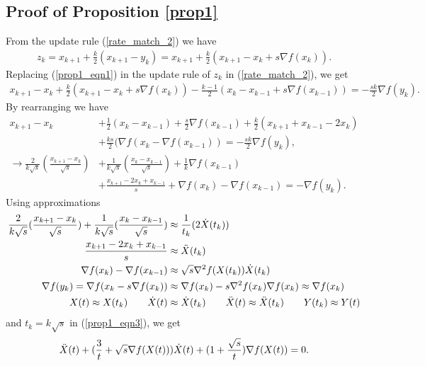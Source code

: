 \documentclass{article}
\theoremstyle{plain}
\theoremstyle{definition}
\theoremstyle{remark}
\begin{document}
\subsection{Proof of Proposition \ref{prop1}}\label{proof_prop1}
    From the update rule (\ref{rate_match_2}) we have
    \begin{align}\label{prop1_eqn1}
        z_k = x_{k+1}+\frac{k}{2}(x_{k+1}-y_k)=x_{k+1}+\frac{k}{2}(x_{k+1}-x_k+s \nabla f(x_k)).
    \end{align}
    Replacing (\ref{prop1_eqn1}) in the update rule of $z_k$ in (\ref{rate_match_2}), we get
    \begin{align}\label{prop1_eqn2}
        x_{k+1}-x_k+\frac{k}{2}(x_{k+1}-x_k+s\nabla f(x_k))-\frac{k-1}{2}(x_k-x_{k-1}+s \nabla f(x_{k-1}))=-\frac{sk}{2}\nabla f(y_k).
    \end{align}
    By rearranging we have
      \begin{align}\label{prop1_eqn3}
        x_{k+1}-x_k&+\frac{1}{2}(x_{k}-x_{k-1})+\frac{s}{2}\nabla f(x_{k-1})+\frac{k}{2}(x_{k+1}+x_{k-1}-2x_k)\nonumber\\
        &+\frac{ks}{2}(\nabla f(x_{k}- \nabla f(x_{k-1}))=-\frac{s k}{2}\nabla f(y_k),\nonumber\\
        \rightarrow \frac{2}{k\sqrt{s}}(\frac{x_{k+1}-x_k}{\sqrt{s}})&+\frac{1}{k\sqrt{s}}(\frac{x_k-x_{k-1}}{\sqrt{s}}) +\frac{1}{k}\nabla f(x_{k-1}) \nonumber\\
        & +\frac{x_{k+1}-2x_k+x_{k-1}}{s}+\nabla f(x_k)-\nabla f(x_{k-1})=-\nabla f(y_k).
    \end{align}
    Using approximations
    \begin{align}\label{prop1_eqn4}
       \frac{2}{k\sqrt{s}}(\frac{x_{k+1}-x_k}{\sqrt{s}})+\frac{1}{k\sqrt{s}}(\frac{x_k-x_{k-1}}{\sqrt{s}})&\approx \frac{1}{t_k}(2 \dot X(t_k))\\
        \frac{x_{k+1}-2x_k+x_{k-1}}{s}&\approx \Ddot{X}(t_k)\\
        \nabla f(x_k)-\nabla f(x_{k-1})&\approx \sqrt{s}\nabla^2 f(X(t_k))\dot X(t_k)\\
        \nabla f(y_k)=\nabla f(x_k-s\nabla f(x_k))&\approx \nabla f(x_k)-s\nabla^2 f(x_k)\nabla f(x_k)\approx \nabla f(x_k)\\
        X(t)\approx X(t_k)\qquad \dot X(t)&\approx\dot X(t_k)\qquad \Ddot X(t)\approx\Ddot X(t_k) \qquad Y(t_k)\approx Y(t)
    \end{align}
    and $t_k=k\sqrt{s}$ in (\ref{prop1_eqn3}), we get
\begin{align}\label{prop1_eqn5}
    \Ddot{X}(t)+(\frac{3}{t}+\sqrt{s}\nabla f(X(t)))\dot X(t)+(1+\frac{\sqrt{s}}{t})\nabla f(X(t))=0.
\end{align}
\end{document}
